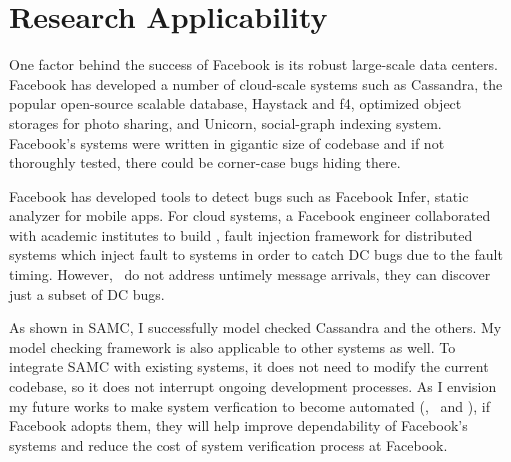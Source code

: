 \documentclass[11pt]{article}
\begin{document}
\section{Research Applicability}

One factor behind the success of Facebook is its robust large-scale data
centers. Facebook has developed a number of cloud-scale systems such as
Cassandra, the popular open-source scalable database, Haystack and f4, optimized
object storages for photo sharing, and Unicorn, social-graph indexing system.
Facebook's systems were written in gigantic size of codebase and if not
thoroughly tested, there could be corner-case bugs hiding there.

Facebook has developed tools to detect bugs such as Facebook Infer, static
analyzer for mobile apps. For cloud systems, a Facebook engineer collaborated
with academic institutes to build \fad, fault injection framework for
distributed systems which inject fault to systems in order to catch DC bugs due
to the fault timing. However, \fad\ do not address untimely message arrivals,
they can discover just a subset of DC bugs.

As shown in SAMC, I successfully model checked Cassandra and the others. My
model checking framework is also applicable to other systems as well. To
integrate SAMC with existing systems, it does not need to modify the current
codebase, so it does not interrupt ongoing development processes. As I envision
my future works to make system verfication to become automated (\ie, \autocheck\
and \deepcheck), if Facebook adopts them, they will help improve dependability
of Facebook's systems and reduce the cost of system verification process at
Facebook.
\end{document}
